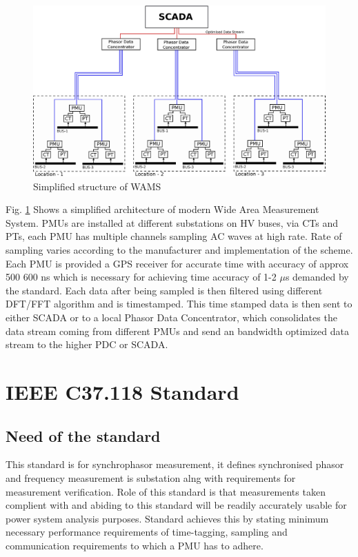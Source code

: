 \begin{figure}
	\includegraphics[width=\textwidth]{fig/wams.eps}
	\caption{Simplified structure of WAMS}
	\label{fig:wams}
\end{figure}

Fig. \ref{fig:wams} Shows a simplified architecture of modern Wide Area Measurement System. PMUs are installed at different substations on HV buses, via CTs and PTs, each PMU has multiple channels sampling AC waves at high rate. Rate of sampling varies according to the manufacturer and implementation of the scheme. Each PMU is provided a GPS receiver for accurate time with accuracy of approx 500 600 ns which is necessary for achieving time accuracy of 1-2 $\mu$s demanded by the standard. Each data after being sampled is then filtered using different DFT/FFT algorithm and is timestamped. This time stamped data is then sent to either SCADA or to a local Phasor Data Concentrator, which consolidates the data stream coming from different PMUs and send an bandwidth optimized data stream to the higher PDC or SCADA. 

\section{IEEE C37.118 Standard}

\subsection{Need of the standard}
This standard is for synchrophasor measurement, it defines synchronised phasor and frequency measurement is substation alng with requirements for measurement verification. Role of this standard is that measurements taken complient with and abiding to this standard will be readily accurately usable for power system analysis purposes. Standard achieves this by stating minimum necessary performance requirements of time-tagging, sampling and communication requirements to which a PMU has to adhere.

